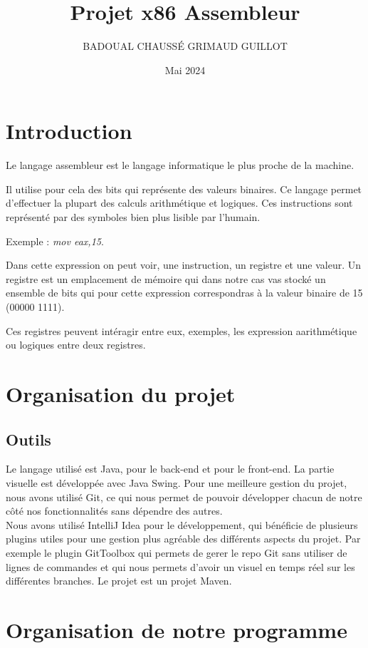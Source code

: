 \documentclass{article}
\title{Projet x86 Assembleur}
\author{BADOUAL CHAUSSÉ GRIMAUD GUILLOT}
\date{Mai 2024}
\begin{document}
\maketitle

\section{Introduction}
Le langage assembleur est le langage informatique le plus proche de la machine.

Il utilise pour cela des bits qui représente des valeurs binaires. Ce langage permet d'effectuer la plupart des calculs arithmétique et logiques. Ces instructions sont représenté par des symboles bien plus lisible par l'humain.

Exemple : \emph{mov eax,15}.

Dans cette expression on peut voir, une instruction, un registre et une valeur. Un registre est un emplacement de mémoire qui dans notre cas vas stocké un ensemble de bits qui pour cette expression correspondras à la valeur binaire de 15 (00000 1111).

Ces registres peuvent intéragir entre eux, exemples, les expression aarithmétique ou logiques entre deux registres.

\section{Organisation du projet}

\subsection{Outils}
Le langage utilisé est Java, pour le back-end et pour le front-end.
La partie visuelle est développée avec Java Swing.
Pour une meilleure gestion du projet, nous avons utilisé Git, ce qui nous permet de pouvoir développer chacun de notre côté nos fonctionnalités sans dépendre des autres.
\\
Nous avons utilisé IntelliJ Idea pour le développement, qui bénéficie de plusieurs plugins utiles pour une gestion plus agréable des différents aspects du projet.
Par exemple le plugin GitToolbox qui permets de gerer le repo Git sans utiliser de lignes de commandes et qui nous permets d'avoir un visuel en temps réel sur les différentes branches.
Le projet est un projet Maven.

\section{Organisation de notre programme}
\end{document}
